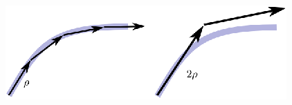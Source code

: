 
            \begin{figure}
                \centering
                \includegraphics[height=0.1\textheight]{stepSize}
                \caption{}
            \end{figure}


